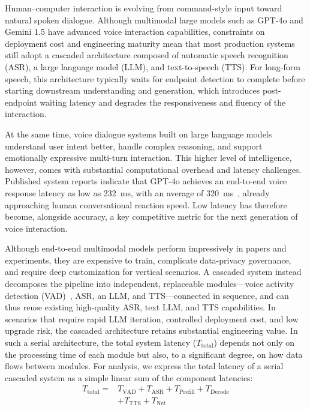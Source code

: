 \documentclass[pdflatex,iicol,Numbered,sn-basic]{sn-jnl}%
\begin{document}
Human--computer interaction is evolving from command-style input toward natural spoken dialogue. Although multimodal large models such as GPT-4o and Gemini 1.5 have advanced voice interaction capabilities, constraints on deployment cost and engineering maturity mean that most production systems still adopt a cascaded architecture composed of automatic speech recognition (ASR), a large language model (LLM), and text-to-speech (TTS). For long-form speech, this architecture typically waits for endpoint detection to complete before starting downstream understanding and generation, which introduces post-endpoint waiting latency and degrades the responsiveness and fluency of the interaction.

At the same time, voice dialogue systems built on large language models understand user intent better, handle complex reasoning, and support emotionally expressive multi-turn interaction. This higher level of intelligence, however, comes with substantial computational overhead and latency challenges. Published system reports indicate that GPT-4o achieves an end-to-end voice response latency as low as 232~ms, with an average of 320~ms~\cite{ref1}, already approaching human conversational reaction speed. Low latency has therefore become, alongside accuracy, a key competitive metric for the next generation of voice interaction.

Although end-to-end multimodal models perform impressively in papers and experiments, they are expensive to train, complicate data-privacy governance, and require deep customization for vertical scenarios. A cascaded system instead decomposes the pipeline into independent, replaceable modules---voice activity detection (VAD)~\cite{ref2}, ASR, an LLM, and TTS---connected in sequence, and can thus reuse existing high-quality ASR, text LLM, and TTS capabilities. In scenarios that require rapid LLM iteration, controlled deployment cost, and low upgrade risk, the cascaded architecture retains substantial engineering value. In such a serial architecture, the total system latency ($T_{\mathrm{total}}$) depends not only on the processing time of each module but also, to a significant degree, on how data flows between modules. For analysis, we express the total latency of a serial cascaded system as a simple linear sum of the component latencies:
\begin{align}
T_{\mathrm{total}} ={}& T_{\mathrm{VAD}} + T_{\mathrm{ASR}} + T_{\mathrm{Prefill}} + T_{\mathrm{Decode}} \nonumber\\
& + T_{\mathrm{TTS}} + T_{\mathrm{Net}}
\label{eq:total}
\end{align}
\end{document}
